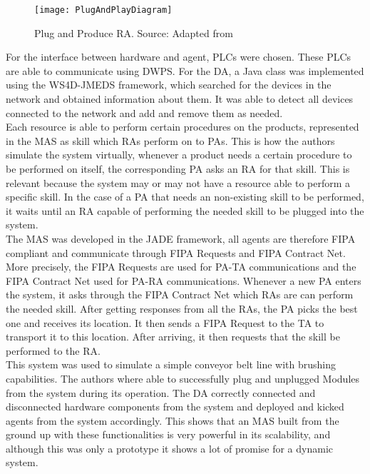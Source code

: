 \begin{figure}[h!]
	\centering
	\texttt{[image: PlugAndPlayDiagram]}
	\caption{Plug and Produce \gls{RA}. Source: Adapted from \cite{8972169}}
	\label{fig:plug_and_play_device_architecture}
\end{figure}

For the interface between hardware and agent, \gls{PLC}s were chosen. These \gls{PLC}s are able to communicate using \gls{DWPS}. For the \gls{DA}, a Java class was implemented using the \gls{WS4D-JMEDS} framework, which searched for the devices in the network and obtained information about them. It was able to detect all devices connected to the network and add and remove them as needed.\\

Each resource is able to perform certain procedures on the products, represented in the \gls{MAS} as skill which \gls{RA}s perform on to \gls{PA}s. This is how the authors simulate the system virtually, whenever a product needs a certain procedure to be performed on itself, the corresponding \gls{PA} asks an \gls{RA} for that skill. This is relevant because the system may or may not have a resource able to perform a specific skill. In the case of a \gls{PA} that needs an non-existing skill to be performed, it waits until an \gls{RA} capable of performing the needed skill to be plugged into the system.\\

The \gls{MAS} was developed in the JADE framework, all agents are therefore \gls{FIPA} compliant and communicate through \gls{FIPA} Requests and \gls{FIPA} Contract Net. More precisely, the \gls{FIPA} Requests are used for \gls{PA}-\gls{TA} communications and the \gls{FIPA} Contract Net used for \gls{PA}-\gls{RA} communications. Whenever a new \gls{PA} enters the system, it asks through the \gls{FIPA} Contract Net which \gls{RA}s are can perform the needed skill. After getting responses from all the \gls{RA}s, the \gls{PA} picks the best one and receives its location. It then sends a \gls{FIPA} Request to the \gls{TA} to transport it to this location. After arriving, it then requests that the skill be performed to the \gls{RA}.\\

This system was used to simulate a simple conveyor belt line with brushing capabilities. The authors where able to successfully plug and unplugged Modules from the system during its operation. The \gls{DA} correctly connected and disconnected hardware components from the system and deployed and kicked agents from the system accordingly. This shows that an \gls{MAS} built from the ground up with these functionalities is very powerful in its scalability, and although this was only a prototype it shows a lot of promise for a dynamic system.


